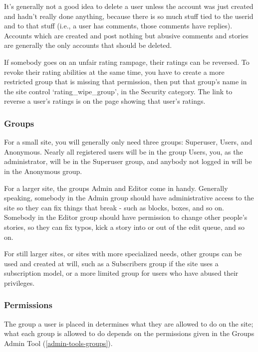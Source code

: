 It's generally not a good idea to delete a user unless the account was just created and hadn't really done anything, because there is so much stuff tied to the userid and to that stuff (i.e., a user has comments, those comments have replies). Accounts which are created and post nothing but abusive comments and stories are generally the only accounts that should be deleted.

If somebody goes on an unfair rating rampage, their ratings can be reversed.  To revoke their rating abilities at the same time, you have to create a more restricted group that is missing that permission, then put that group's name in the site control `rating\_wipe\_group', in the Security category. The link to reverse a user's ratings is on the page showing that user's ratings.

\subsubsection{Groups}
\label{admin-users-groups}

For a small site, you will generally only need three groups: Superuser, Users, and Anonymous.  Nearly all registered users will be in the group Users, you, as the administrator, will be in the Superuser group, and anybody not logged in will be in the Anonymous group.

For a larger site, the groups Admin and Editor come in handy.  Generally speaking, somebody in the Admin group should have administrative access to the site so they can fix things that break - such as blocks, boxes, and so on.  Somebody in the Editor group should have permission to change other people's stories, so they can fix typos, kick a story into or out of the edit queue, and so on.

For still larger sites, or sites with more specialized needs, other groups can be used and created at will, such as a Subscribers group if the site uses a subscription model, or a more limited group for users who have abused their privileges.

\subsubsection{Permissions}
\label{user-perms}

The group a user is placed in determines what they are allowed to do on the site; what each group is allowed to do depends on the permissions given in the Groups Admin Tool (\ref{admin-tools-groups}).

